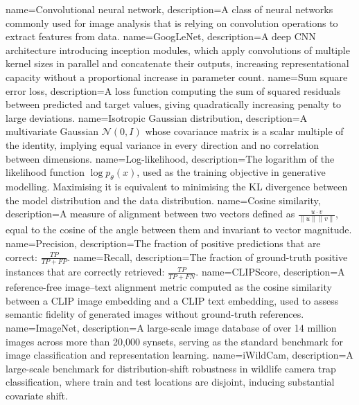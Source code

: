 {
    name={Convolutional neural network},
    description={A class of neural networks commonly used for image analysis that is relying on convolution operations to extract features from data.}
}
{
    name={GoogLeNet},
    description={A deep CNN architecture introducing inception modules, which apply convolutions of multiple kernel sizes in parallel and concatenate their outputs, increasing representational capacity without a proportional increase in parameter count.}
}
{
    name={Sum square error loss},
    description={A loss function computing the sum of squared residuals between predicted and target values, giving quadratically increasing penalty to large deviations.}
}
{
    name={Isotropic Gaussian distribution},
    description={A multivariate Gaussian $\mathcal{N}(0, I)$ whose covariance matrix is a scalar multiple of the identity, implying equal variance in every direction and no correlation between dimensions.}
}
{
    name={Log-likelihood},
    description={The logarithm of the likelihood function $\log p_\theta(x)$, used as the training objective in generative modelling. Maximising it is equivalent to minimising the KL divergence between the model distribution and the data distribution.}
}
{
    name={Cosine similarity},
    description={A measure of alignment between two vectors defined as $\frac{u \cdot v}{\|u\|\|v\|}$, equal to the cosine of the angle between them and invariant to vector magnitude.}
}
{
    name={Precision},
    description={The fraction of positive predictions that are correct: $\frac{TP}{TP + FP}$.}
}
{
    name={Recall},
    description={The fraction of ground-truth positive instances that are correctly retrieved: $\frac{TP}{TP + FN}$.}
}
{
    name={CLIPScore},
    description={A reference-free image--text alignment metric computed as the cosine similarity between a CLIP image embedding and a CLIP text embedding, used to assess semantic fidelity of generated images without ground-truth references.}
}
{
    name={ImageNet},
    description={A large-scale image database of over 14 million images across more than 20,000 synsets, serving as the standard benchmark for image classification and representation learning.}
}
{
    name={iWildCam},
    description={A large-scale benchmark for distribution-shift robustness in wildlife camera trap classification, where train and test locations are disjoint, inducing substantial covariate shift.}
}
